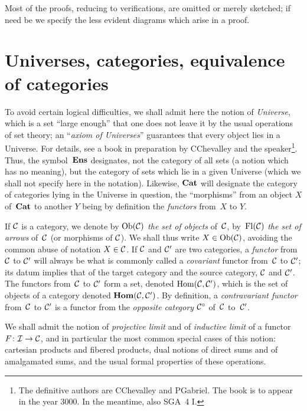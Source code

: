 Most of the proofs, reducing to
verifications, are omitted or merely sketched; if need
be we specify the less evident diagrams
which arise in a proof.

\section{Universes, categories, equivalence of categories}
\label{VI.1}

To avoid certain logical difficulties, we shall admit
here the notion of \emph{Universe}, which is a set ``large enough''
that one does not leave it by the usual operations of
set theory; an ``\emph{axiom of Universes}'' guarantees
that every object lies in a Universe. For details, see
a book in preparation by C\ptbl Chevalley and the speaker\footnote{%
The definitive authors are C\ptbl Chevalley and P\ptbl Gabriel. The book is to appear in the year 3000. In the meantime, \cf also SGA~4 I.}. Thus, the symbol~$\Ens$
designates, not the category of all sets (a notion
which has no meaning), but the category of sets which
lie in a given Universe (which we shall not specify
here in the notation). Likewise, $\Cat$
will designate the category of categories lying in
the Universe in question, the ``morphisms'' from an object $X$ of~$\Cat$
to another $Y$ being by definition the \emph{functors}
from~$X$ to $Y$.

If
$\cal{C}$ is a category, we denote by $\Ob(\cal{C})$
\emph{the set of objects} of~$\cal{C}$, by~$\Fl(\cal{C})$
\emph{the set of arrows} of~$\cal{C}$ (or morphisms of
$\cal{C}$). We shall thus write $X\in\Ob(\cal{C})$, avoiding
the common abuse of notation $X\in\cal{C}$. If $\cal{C}$ and $\cal{C}'$
are two categories, a \emph{functor} from~$\cal{C}$ to
$\cal{C}'$ will always be what is commonly called a
\emph{covariant} functor from~$\cal{C}$ to $\cal{C}'$; its datum implies
that of the target category and the source
category, $\cal{C}$ and $\cal{C}'$. The functors from~$\cal{C}$ to
$\cal{C}'$ form a set, denoted $\Hom(\cal{C},\cal{C}')$, which
is the set of objects of a category denoted
$\SheafHom(\cal{C},\cal{C}')$.
By definition, a \emph{contravariant functor} from~$\cal{C}$ to
$\cal{C}'$ is a functor from the \emph{opposite category}
$\cal{C}^\circ$
of~$\cal{C}$ to~$\cal{C}'$.

We shall admit the notion of \emph{projective limit} and of
\emph{inductive limit} of a functor $F\colon \cal{I}\to \cal{C}$, and
in particular the most common special cases of this notion:
cartesian products and fibered products, dual notions of
direct sums and of amalgamated sums, and the usual
formal properties of these operations.

